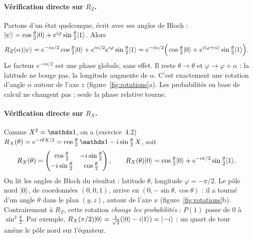 \paragraph{Vérification directe sur $R_Z$.} Partons d'un état quelconque, écrit avec ses angles de Bloch : $\lvert \psi\rangle=\cos\tfrac\theta2\lvert 0\rangle+e^{i\varphi}\sin\tfrac\theta2\lvert 1\rangle$. Alors
\[
R_Z(\alpha)\lvert \psi\rangle=e^{-i\alpha/2}\cos\tfrac\theta2\lvert 0\rangle+e^{i\alpha/2}e^{i\varphi}\sin\tfrac\theta2\lvert 1\rangle
=e^{-i\alpha/2}\Big(\cos\tfrac\theta2\lvert 0\rangle+e^{i(\varphi+\alpha)}\sin\tfrac\theta2\lvert 1\rangle\Big).
\]
Le facteur $e^{-i\alpha/2}$ est une phase globale, sans effet. Il reste $\theta\to\theta$ et $\varphi\to\varphi+\alpha$ : la latitude ne bouge pas, la longitude augmente de $\alpha$. C'est exactement une rotation d'angle $\alpha$ autour de l'axe $z$ (figure~\ref{fig:rotations}a). Les probabilités en base de calcul ne changent pas ; seule la phase relative tourne.

\paragraph{Vérification directe sur $R_X$.} Comme $X^2=\Id$, on a (exercice~4.2) $R_X(\theta)=e^{-i\theta X/2}=\cos\tfrac\theta2\,\Id-i\sin\tfrac\theta2\,X$, soit
\[
R_X(\theta)=\begin{pmatrix}\cos\frac\theta2&-i\sin\frac\theta2\\[2pt]-i\sin\frac\theta2&\cos\frac\theta2\end{pmatrix},\qquad
R_X(\theta)\lvert 0\rangle=\cos\tfrac\theta2\lvert 0\rangle+e^{-i\pi/2}\sin\tfrac\theta2\lvert 1\rangle .
\]
On lit les angles de Bloch du résultat : latitude $\theta$, longitude $\varphi=-\pi/2$. Le pôle nord $\lvert 0\rangle$, de coordonnées $(0,0,1)$, arrive en $(0,-\sin\theta,\cos\theta)$ : il a tourné d'un angle $\theta$ dans le plan $(y,z)$, autour de l'axe $x$ (figure~\ref{fig:rotations}b). Contrairement à $R_Z$, cette rotation \emph{change les probabilités} : $P(1)$ passe de 0 à $\sin^2\tfrac\theta2$. Par exemple, $R_X(\pi/2)\lvert 0\rangle=\tfrac1{\sqrt2}(\lvert 0\rangle-i\lvert 1\rangle)=\lvert -i\rangle$ : un quart de tour amène le pôle nord sur l'équateur.

